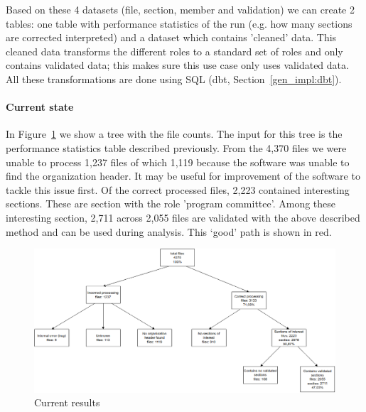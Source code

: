 \documentclass{ou-report}
\begin{document}
Based on these 4 datasets (file, section, member and validation) we can create
2 tables: one table with performance statistics of the run (e.g. how many
sections are corrected interpreted) and a dataset which contains 'cleaned'
data. This cleaned data transforms the different roles to a standard set of 
roles and only contains validated data; this makes sure this use case only uses
validated data. All these transformations are done using SQL (dbt,
Section~\ref{gen_impl:dbt}).

\paragraph{Current state}
In Figure~\ref{fig:front_matter_result} we show a tree with the file counts.
The input for this tree is the performance statistics table described 
previously. From the 4,370 files we were unable to process 1,237 files of which
1,119 because the software was unable to find the organization header. It may be
useful for improvement of the software to tackle this issue first.
Of the correct processed files, 2,223 contained interesting sections. These are
section with the role 'program committee'. Among these interesting section, 2,711
across 2,055 files are validated with the above described method and can be used
during analysis. This `good' path is shown in red.

\begin{figure}[H]
    \centering
    \includegraphics[width=17cm]{images/lncs_front_matter_result.png}
    \caption{Current results}
    \label{fig:front_matter_result}
\end{figure}

\end{document}
